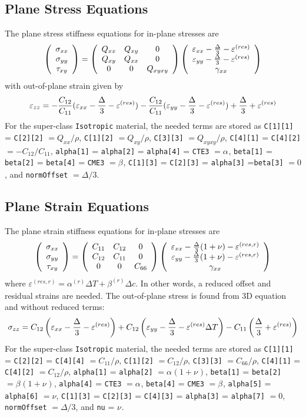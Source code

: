\documentclass[11pt]{article}
\def\a#1{\alpha_{#1}}
\def\b#1{\beta_{#1}}
\def\code#1{{\small\tt #1}}
\def\DT{\Delta T}
\def\e#1{\varepsilon_{#1}}
\def\er#1{\varepsilon_{#1}^{(res)}}
\def\err#1{\varepsilon_{#1}^{(res,r)}}
\def\g#1{\gamma_{#1}}
\def\s#1{\sigma_{#1}}
\def\symmat#1#2#3#4#5#6{\left(\begin{array}{ccc} #1 & #2 & #3 \\ #2 & #4 & #5 \\
                                                      #3 & #5 & #6 \end{array}\right)}
\def\t#1{\tau_{#1}}
\def\v#1{\nu_{#1}}
\def\vvec#1#2#3{\left(\begin{array}{ccc} #1 \\ #2 \\ #3 \end{array}\right)}
\begin{document}
\subsection{Plane Stress Equations}

The plane stress stiffness equations for in-plane stresses are
\begin{equation}
      \vvec{\s{xx}}{\s{yy}}{\t{xy}} = \symmat{Q_{xx}}{Q_{xy}}{0}{Q_{xx}}{0}{Q_{xyxy}}
          \vvec{\e{xx}- {\Delta\over 3}  - \er{}}{\e{yy}- {\Delta\over 3}  - \er{}}{\g{xx}}
 \end{equation}
with out-of-plane strain given  by
\begin{equation}
            \e{zz} = -{C_{12}\over C_{11}}(\e{xx}- {\Delta\over 3} -\er{}) - {C_{12}\over C_{11}}(\e{yy} - {\Delta\over 3}-\er{}) 
                   + {\Delta\over 3}  + \er{}
\end{equation}
For the super-class \code{Isotropic} material, the needed terms are stored as \code{C[1][1]} = \code{C[2][2]} $= Q_{xx}/\rho$,  \code{C[1][2]} $= Q_{xy}/\rho$,  \code{C[3][3]} $= Q_{xyxy}/\rho$,  \code{C[4][1]} =  \code{C[4][2]}$= -C_{12}/C_{11}$,  \code{alpha[1]} = \code{alpha[2]} = \code{alpha[4]} = \code{CTE3}  $=\a{}$, \code{beta[1]} = \code{beta[2]} = \code{beta[4]} = \code{CME3}  $=\b{}$, \code{C[1][3]} = \code{C[2][3]} = \code{alpha[3]} =\code{beta[3]} $=0$, and \code{normOffset} $=\Delta/3$.

\subsection{Plane Strain Equations}

The plane strain stiffness equations for in-plane stresses are
\begin{equation}
      \vvec{\s{xx}}{\s{yy}}{\t{xy}} = \symmat{C_{11}}{C_{12}}{0}{C_{11}}{0}{C_{66}}
          \vvec{\e{xx} - {\Delta\over 3}(1+\nu) - \err{}}{\e{yy} - {\Delta\over 3}(1+\nu)  - \err{}}{\g{xx}}
 \end{equation}
 where $\err{}=\a{}^{(r)}\DT+\b{}^{(r)}\Delta c$.
 In other words, a reduced offset and residual strains are needed. The out-of-plane stress is found from 3D equation and without reduced terms:
 \begin{equation}
            \s{zz} = C_{12}\left(\e{xx} - {\Delta\over 3} -\er{}\right) 
                            +C_{12}\left(\e{yy} - {\Delta\over 3} -\er{}\DT\right) 
                            -C_{11}\left({\Delta\over 3} +\er{}\right) 
\end{equation}
For the super-class \code{Isotropic} material, the needed terms are stored as \code{C[1][1]} = \code{C[2][2]} = \code{C[4][4]} $= C_{11}/\rho$,  \code{C[1][2]} $= C_{12}/\rho$,  \code{C[3][3]} $= C_{66}/\rho$,  \code{C[4][1]} =  \code{C[4][2]} $= C_{12}/\rho$, \code{alpha[1]} = \code{alpha[2]} $=\a{}(1+\v{})$, \code{beta[1]} = \code{beta[2]} $=\b{}(1+\v{})$, \code{alpha[4]} = \code{CTE3} $=\a{}$, \code{beta[4]} = \code{CME3} $=\b{}$, \code{alpha[5]} = \code{alpha[6]} $=\nu$, \code{C[1][3]} = \code{C[2][3]} = \code{C[4][3]} = \code{alpha[3]} = \code{alpha[7]} $=0$, \code{normOffset} $=\Delta/3$, and \code{nu} = $\v{}$.
\end{document}
